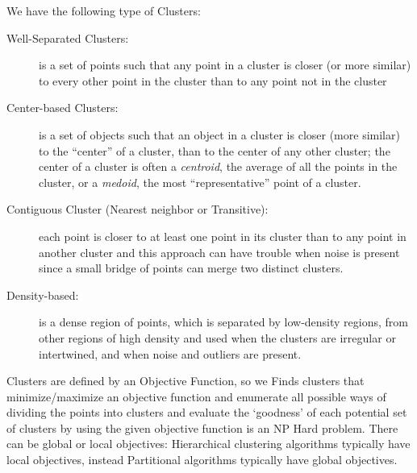 We have the following type of Clusters:
\begin{description}
    \item [Well-Separated Clusters: ] is a set of points such that any point in a cluster is closer (or more similar) to every other point in the cluster than to any point not in the cluster

    \item [Center-based Clusters: ] is a set of objects such that an object in a cluster is closer (more similar) to the “center” of a cluster, than to the center of any other cluster; 
	                            the center of a cluster is often a \emph{centroid}, the average of all the points in the cluster, or a \emph{medoid}, the most “representative” point of a cluster.

    \item [Contiguous Cluster (Nearest neighbor or Transitive): ] each point is closer to at least one point in its cluster than to any point in another cluster and 
	                                                          this approach can have trouble when noise is present since a small bridge of points can merge two distinct clusters.

    \item [Density-based: ] is a dense region of points, which is separated by low-density regions, from other regions of high density and used when the clusters are irregular or intertwined, and when noise and outliers are present.
\end{description}
Clusters are defined by an Objective Function, so we Finds clusters that minimize/maximize an objective function and enumerate all possible ways of dividing the points into clusters and evaluate the `goodness' of each potential
set of clusters by using the given objective function is an NP Hard problem.\newline
There can be global or local objectives: Hierarchical clustering algorithms typically have local objectives, instead Partitional algorithms typically have global objectives.


